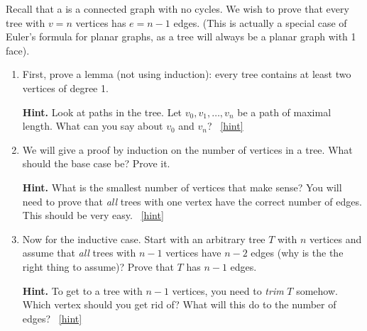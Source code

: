 \documentclass{book}
\begin{document}
\setcounter{project}{23}
\addtocounter{project}{-1}
\begin{activity}[]\label{activity-18}
\hypertarget{p-256}{}%
Recall that a  is a connected graph with no cycles.  We wish to prove that every tree with \(v = n\) vertices has \(e = n-1\) edges.  (This is actually a special case of Euler's formula for planar graphs, as a tree will always be a planar graph with 1 face).%
\begin{enumerate}[font=\bfseries,label=(\alph*),ref=\alph*]
\item\label{task-28} \hypertarget{p-257}{}%
First, prove a lemma (not using induction): every tree contains at least two vertices of degree 1.%
\par\smallskip%
\noindent\textbf{Hint.}\hypertarget{hint-4}{}\quad%
\hypertarget{p-258}{}%
Look at paths in the tree.  Let \(v_0, v_1, \ldots, v_n\) be a path of maximal length.  What can you say about \(v_0\) and \(v_n\)?%
~\hfill{\tiny\hyperlink{a-23.a}{[hint]}\hypertarget{q-23.a}{}}\item\label{task-29} \hypertarget{p-259}{}%
We will give a proof by induction on the number of vertices in a tree.  What should the base case be?  Prove it.%
\par\smallskip%
\noindent\textbf{Hint.}\hypertarget{hint-5}{}\quad%
\hypertarget{p-260}{}%
What is the smallest number of vertices that make sense?  You will need to prove that \emph{all} trees with one vertex have the correct number of edges.  This should be very easy.%
~\hfill{\tiny\hyperlink{a-23.b}{[hint]}\hypertarget{q-23.b}{}}\item\label{task-30} \hypertarget{p-261}{}%
Now for the inductive case.  Start with an arbitrary tree \(T\) with \(n\) vertices and assume that \emph{all} trees with \(n-1\) vertices have \(n-2\) edges (why is the the right thing to assume)?  Prove that \(T\) has \(n-1\) edges.%
\par\smallskip%
\noindent\textbf{Hint.}\hypertarget{hint-6}{}\quad%
\hypertarget{p-262}{}%
To get to a tree with \(n-1\) vertices, you need to \emph{trim} \(T\) somehow.  Which vertex should you get rid of?  What will this do to the number of edges?%
~\hfill{\tiny\hyperlink{a-23.c}{[hint]}\hypertarget{q-23.c}{}}\end{enumerate}
\end{activity}
\end{document}
